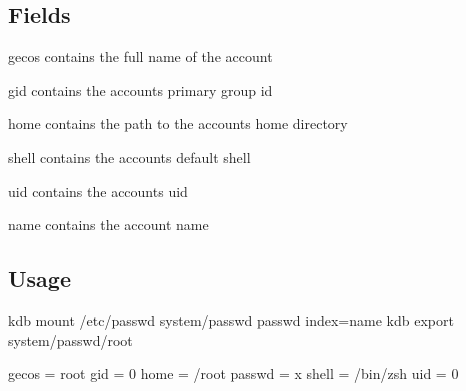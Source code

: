 \subsection*{Fields}


\begin{DoxyItemize}
\item {\ttfamily gecos} contains the full name of the account
\item {\ttfamily gid} contains the accounts primary group id
\item {\ttfamily home} contains the path to the accounts home directory
\item {\ttfamily shell} contains the accounts default shell
\item {\ttfamily uid} contains the accounts uid
\item {\ttfamily name} contains the account name
\end{DoxyItemize}

\subsection*{Usage}

\begin{DoxyVerb}kdb mount /etc/passwd system/passwd passwd index=name
kdb export system/passwd/root

gecos = root
gid = 0
home = /root
passwd = x
shell = /bin/zsh
uid = 0\end{DoxyVerb}
 
